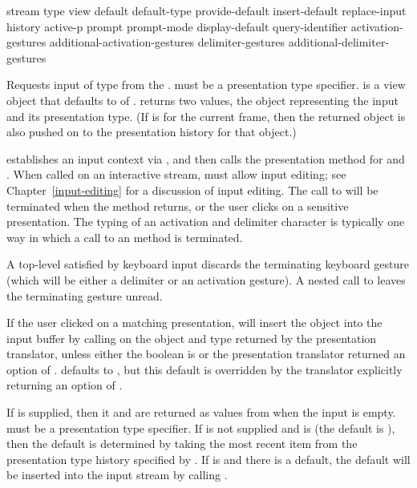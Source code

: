  {stream type
                   \key view
                        default default-type provide-default
                        insert-default replace-input history active-p
                        prompt prompt-mode display-default query-identifier
                        activation-gestures additional-activation-gestures
                        delimiter-gestures additional-delimiter-gestures}

Requests input of type  from the  .
 must be a presentation type specifier.   is a view object
that defaults to  of .  
returns two values, the object representing the input and its presentation type.
(If  is  for the current
frame, then the returned object is also pushed on to the presentation history
for that object.)

 establishes an input context via , and then
calls the  presentation method for  and .  When
called on an interactive stream,  must allow input editing; see
Chapter~\ref{input-editing} for a discussion of input editing.  The call to
 will be terminated when the  method returns, or the user
clicks on a sensitive presentation.  The typing of an activation and delimiter
character is typically one way in which a call to an  method is
terminated.

A top-level  satisfied by keyboard input discards the terminating
keyboard gesture (which will be either a delimiter or an activation gesture).
A nested call to  leaves the terminating gesture unread.

If the user clicked on a matching presentation,  will insert
the object into the input buffer by calling  on
the object and type returned by the presentation translator, unless either the
boolean  is  or the presentation translator
returned an  option of .   defaults to
, but this default is overridden by the translator explicitly
returning an  option of .

If  is supplied, then it and  are returned as
values from  when the input is empty.  
must be a presentation type specifier.  If  is not supplied and
 is  (the default is ), then the
default is determined by taking the most recent item from the presentation type
history specified by .  If  is  and
there is a default, the default will be inserted into the input stream by
calling .

